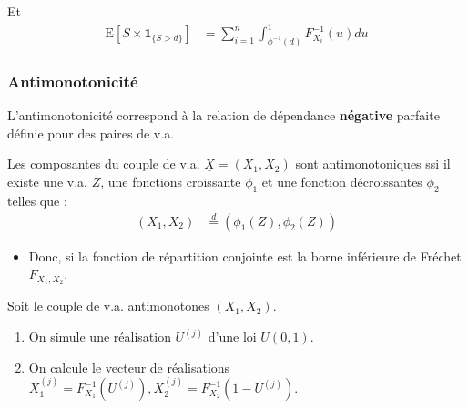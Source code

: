 \documentclass[10pt, french]{article}
\begin{document}
\begin{multicols*}{2}
\begin{definitionNOHFILLpropos}
Et 
\begin{align*}
	\text{E}[S \times \bm{1}_{\{S > d\}}]	
	&=	\sum_{i = 1}^{n} \int_{\phi^{-1}(d)}^{1} F^{-1}_{X_{i}}(u) du
\end{align*}
\end{definitionNOHFILLpropos}



\subsubsection{Antimonotonicité}
L'antimonotonicité correspond à la relation de dépendance \textbf{négative} parfaite définie pour des paires de v.a.

\begin{definitionNOHFILLprop}[Antimonotonicité]
Les composantes du couple de v.a. $\underline{X}	=	(X_{1}, X_{2})$ sont antimonotoniques ssi il existe une v.a. $Z$, une fonctions croissante $\phi_{1}$ et une fonction décroissantes $\phi_{2}$  telles que :
\begin{align*}
	(X_{1}, X_{2})
	&\overset{d}{=}	\left(\phi_{1}(Z), \phi_{2}(Z)\right)
\end{align*}
\begin{itemize}
	\item	Donc, si la fonction de répartition conjointe est la borne inférieure de Fréchet $F^{-}_{X_{1}, X_{2}}$.
\end{itemize}
\end{definitionNOHFILLprop}

\begin{algo2}
Soit le couple de v.a. antimonotones $(X_{1}, X_{2})$.
\begin{enumerate}
	\item	On simule une réalisation $U^{(j)}$ d'une loi $U(0, 1)$.
	\item	On calcule le vecteur de réalisations $X^{(j)}_{1}	=	F_{X_{1}}^{-1}(U^{(j)}), X^{(j)}_{2}	=	F_{X_{2}}^{-1}(1 - U^{(j)})$.
\end{enumerate}
\end{algo2}

\columnbreak

\end{multicols*}
\end{document}
